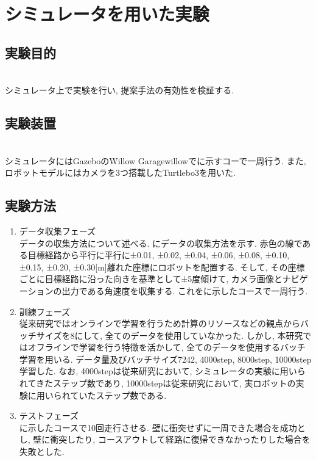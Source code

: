 \documentclass[10pt]{ujarticle}
\begin{document}
    \section{シミュレータを用いた実験}%
    \subsection{実験目的}\mbox{}\\
    シミュレータ上で実験を行い, 提案手法の有効性を検証する. 

    \subsection{実験装置}\mbox{}\\
    シミュレータにはGazebo\cite{gazebo}のWillow Garage{willow}でに示すコーで一周行う. また, ロボットモデルにはカメラを3つ搭載したTurtlebo3\cite{turtlebot3}を用いた. 

    \subsection{実験方法}
    \begin{enumerate}
        \item{データ収集フェーズ}\mbox{}\\データの収集方法について述べる. にデータの収集方法を示す. 赤色の線である目標経路から平行に平行に±0.01, ±0.02, ±0.04, ±0.06, ±0.08, ±0.10, ±0.15, ±0.20, ±0.30[m]離れた座標にロボットを配置する. そして, その座標ごとに目標経路に沿った向きを基準として±5度傾けて, カメラ画像とナビゲーションの出力である角速度を収集する. これをに示したコースで一周行う. 
        \item{訓練フェーズ}\mbox{}\\従来研究ではオンラインで学習を行うため計算のリソースなどの観点からバッチサイズを8にして, 全てのデータを使用していなかった. しかし, 本研究ではオフラインで学習を行う特徴を活かして, 全てのデータを使用するバッチ学習を用いる. データ量及びバッチサイズ7242, 4000step, 8000step, 10000step学習した. なお, 4000stepは従来研究において, シミュレータの実験に用いられてきたステップ数であり, 10000stepは従来研究において, 実ロボットの実験に用いられていたステップ数である. 
        \item{テストフェーズ}\mbox{}\\に示したコースで10回走行させる. 壁に衝突せずに一周できた場合を成功とし, 壁に衝突したり, コースアウトして経路に復帰できなかったりした場合を失敗とした. 
    \end{enumerate}
\end{document}
